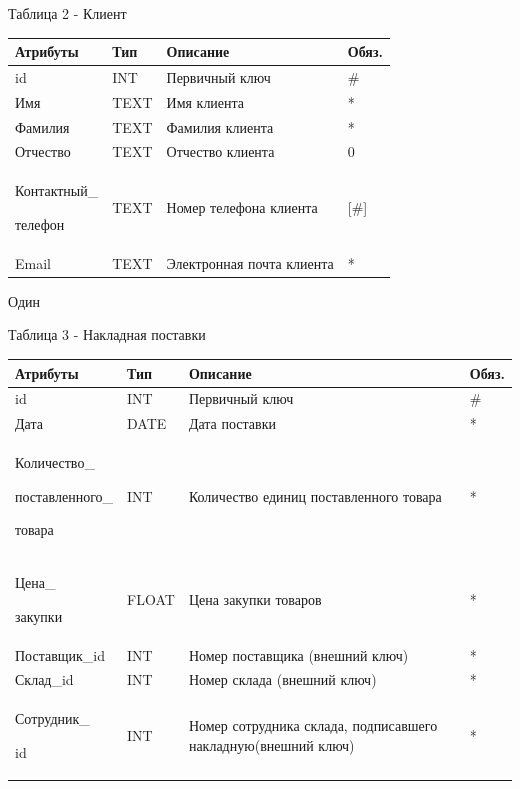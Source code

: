 \documentclass[14pt]{extreport}
\begin{document}
\newpage

\noindent
Таблица 2 - Клиент

\begin{center}
\begin{longtable}{ |m{3.3cm}|m{3cm}|m{6cm}|m{1.8cm}| } 
 \hline
 Атрибуты & Тип & Описание & Обяз. \\ [0.5ex] 
 \hline\hline
 id & INT & Первичный ключ & \# \\
 \hline
 Имя & TEXT & Имя клиента & * \\
 \hline
 Фамилия & TEXT & Фамилия клиента & * \\
 \hline
 Отчество & TEXT & Отчество клиента & 0 \\
 \hline
 Контактный\_
 
 телефон & TEXT & Номер телефона клиента & [\#] \\
 \hline
 Email & TEXT & Электронная почта клиента & * \\
 \hline
\end{longtable}
\end{center}
Один

\noindent
Таблица 3 - Накладная поставки
\begin{center}

\begin{longtable}{ |m{3.3cm}|m{3cm}|m{6cm}|m{1.8cm}| } 
 \hline
 Атрибуты & Тип & Описание & Обяз. \\ [0.5ex] 
 \hline\hline
 id & INT & Первичный ключ & \# \\
 \hline
 Дата & DATE & Дата поставки & * \\
 \hline
 Количество\_ 
 
 поставленного\_
 
 товара & INT & Количество единиц поставленного товара & * \\
 \hline
 Цена\_
 
 закупки & FLOAT & Цена закупки товаров  & * \\ 
 \hline
 Поставщик\_id & INT & Номер поставщика (внешний ключ) & * \\
 \hline
 Склад\_id & INT & Номер склада (внешний ключ) & * \\ 
 \hline
 Сотрудник\_
 
 id & INT & Номер сотрудника склада, подписавшего накладную(внешний ключ) & * \\ 
 \hline

 \hline
\end{longtable}
\end{center}
\end{document}
